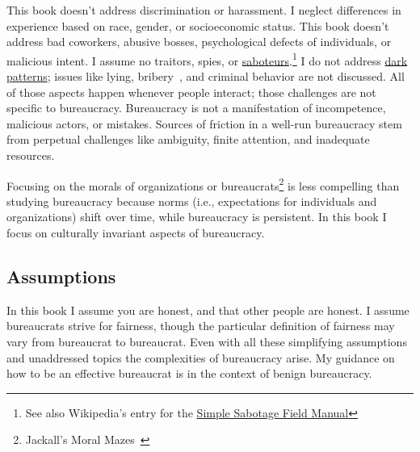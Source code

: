 This book doesn't address discrimination or harassment. I neglect differences in experience based on race, gender, or socioeconomic status. This book doesn't address bad coworkers, abusive bosses, psychological defects of individuals, or malicious intent. I assume no traitors, spies, \iftoggle{WPinmargin}{\marginpar{[Wikipedia] saboteurs}}{}
or \href{https://www.hsdl.org/?abstract&did=750070}{saboteurs}.\footnote{See also Wikipedia's entry for the \href{https://en.wikisource.org/wiki/Simple_Sabotage_Field_Manual}{Simple Sabotage Field Manual}
}
I do not address \href{https://en.wikipedia.org/wiki/Dark_pattern}{dark patterns}; 
issues like lying, bribery~\cite{2021_Ang}, and criminal behavior are not discussed. All of those aspects happen whenever people interact; those challenges are not specific to bureaucracy. 
Bureaucracy is not a manifestation of incompetence, malicious actors, or mistakes. Sources of friction in a well-run bureaucracy stem from perpetual challenges like ambiguity, finite attention, and inadequate resources.

Focusing on the morals of organizations or bureaucrats\footnote{Jackall's Moral Mazes~\cite{2009_Jackall}} is less compelling than studying bureaucracy because norms (i.e., expectations for individuals and organizations) shift over time, while bureaucracy is persistent. 
In this book I focus on culturally invariant aspects of bureaucracy. 


\subsection*{Assumptions}
In this book I assume you are honest, and that other people are honest.  
I assume bureaucrats strive for fairness, though the particular definition of fairness may vary from bureaucrat to bureaucrat. 
Even with all these simplifying assumptions and unaddressed topics the complexities of bureaucracy arise. My guidance on how to be an effective bureaucrat is in the context of benign bureaucracy.



